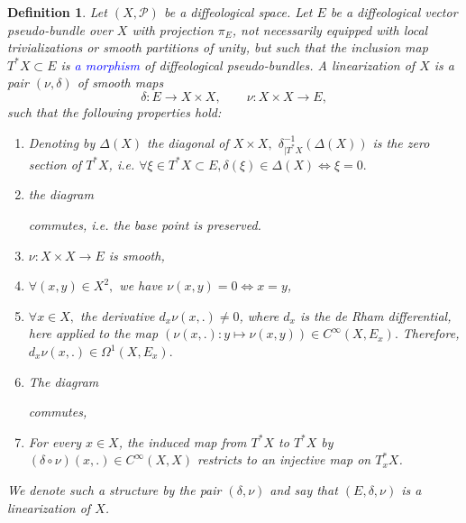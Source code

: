 \documentclass{amsart}
\newcommand{\minor}[1]{\textcolor{blue}{#1}}
\newcommand{\p}{\mathcal{P}}
\newcounter{thm}
\newcounter{ex}
\newcounter{re}
\newtheorem{Definition}[thm]{Definition}
\begin{document}
\begin{Definition} \label{d:linearisation}
	Let $(X,\p)$ be a diffeological space. Let $E$ be a diffeological vector pseudo-bundle over $X$ with projection $\pi_E$, not necessarily equipped with local trivializations or smooth partitions of unity, but such that the inclusion map $T^*X \subset E$ is \minor{a morphism} of diffeological pseudo-bundles. A \emph{linearization} of $X$ is a pair $(\nu,\delta)$ of smooth maps {\color{black} \[
  \delta : E \longrightarrow X \times X,
  \qquad
  \nu : X \times X \longrightarrow E,
\]
such that the following properties hold:}
	
	\begin{enumerate}
		\item[(1)] {\color{black} Denoting by $\Delta(X)$ the diagonal of $X\times X,$} $\delta^{-1}_{|T^*X}(\Delta(X))$ is the zero section of $T^*X$, {\color{black} i.e. $\forall \xi \in T^*X \subset E, \delta(\xi) \in \Delta(X) \Leftrightarrow \xi = 0.$}
        \item[(2)] the diagram
		\begin{center}
		\end{center}
		commutes, {\color{black} i.e. the base point is preserved.}
		\item[(3)] $\nu : X \times X \rightarrow E$ is smooth,
		\item[(4)] \label{i:x=y} $\forall (x,y) \in X^2,$ we have $\nu(x,y)=0 \Leftrightarrow x=y$,
		\item[(5)] $\forall x \in X,$ the derivative $d_x\nu(x,.) \neq 0$, {\color{black} where $d_x$ is the de Rham differential, here applied to the map $(\nu(x,.): y \mapsto \nu(x,y)) \in C^\infty(X,E_x). $ Therefore, $d_x\nu(x,.) \in \Omega^1(X,E_x).$}
		\item[(6)] The diagram
		\begin{center}
		\end{center}
		commutes,
		\item[(7)] For every $x \in X$, the induced map from $T^*X$ to $T^*X$ by $(\delta \circ \nu)(x,.) \in C^\infty(X,X)$ restricts to an injective map on $T^*_xX$.
	\end{enumerate}
    {\color{black} We denote such a structure by the pair \((\delta,\nu)\) and say that \( (E,\delta,\nu) \) is a linearization of \(X\).}
\end{Definition}
\end{document}
